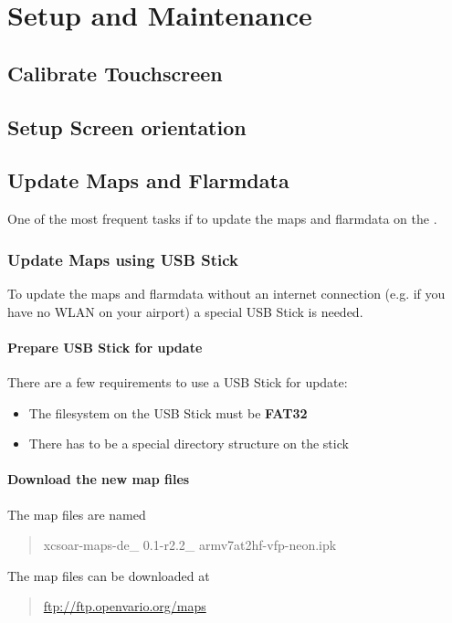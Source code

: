 \chapter{Setup and Maintenance}

\section{Calibrate Touchscreen}\label{cha:cal_touch}

\section{Setup Screen orientation}\label{cha:setup_scr_or}

\section{Update Maps and Flarmdata}\label{cha:upd_map_flarm}
One of the most frequent tasks if to update the maps and flarmdata on the \ovfc.

\subsection{Update Maps using USB Stick}\label{cha:upd_maps_usb}
To update the maps and flarmdata without an internet connection (e.g. if you have no 
WLAN on your airport) a special USB Stick is needed.

\subsubsection{Prepare USB Stick for update}
There are a few requirements to use a USB Stick for update:
\begin{itemize}
\item The filesystem on the USB Stick must be \textbf{FAT32}
\item There has to be a special directory structure on the stick
\end{itemize}

\subsubsection{Download the new map files}
The map files are named 
\begin{quote}
	xcsoar-maps-de\_ 0.1-r2.2\_ armv7at2hf-vfp-neon.ipk
\end{quote}

The map files can be downloaded at 
\begin{quote}
\url{ftp://ftp.openvario.org/maps}
\end{quote}

